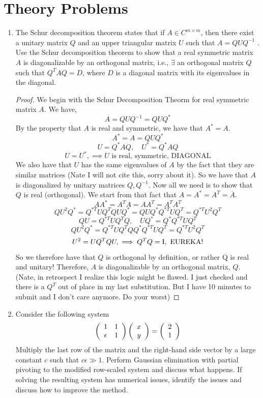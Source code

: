 \documentclass{article}
\begin{document}
\section{Theory Problems}
\begin{enumerate}

\item %
The Schur decomposition theorem states that if $A \in C^{m\times m}$, then there
exist a unitary matrix $Q$ and an upper triangular matrix $U$ such that
$A = QUQ^{-1}$ . Use the Schur decomposition theorem to show that a real
symmetric matrix $A$ is diagonalizable by an orthogonal matrix, i.e., $\exists$ an
orthogonal matrix $Q$ such that $Q^T AQ = D$, where $D$ is a diagonal matrix
with its eigenvalues in the diagonal.

\begin{proof}

We begin with the Schur Decomposition Theorm for real symmetric matrix $A$. We have, 
\[
    A = QUQ^{-1} = QUQ^*
\]
By the property that $A$ is real and symmetric, we have that $A^* = A$.
\[
    A^* = A = QUQ^*
\]
\[
    U = Q^*AQ, \quad U^* = Q^*AQ
\]
\[
    U = U^*, \implies U \text{ is real, symmetric, DIAGONAL}
\]
We also have that $U$ has the same eigenvalues of $A$ by the fact that they are similar matrices (Nate I will not cite this, sorry about it). So we have that $A$ is diagonalized by unitary matrices $Q, Q^{-1}$. Now all we need is to show that $Q$ is real (orthogonal). We start from that fact that $A = A^* = A^T = \overline{A}$.
\[
    AA^* = A^TA = AA^T = A^TA^T
\] 
\[
    QU^2Q^* = Q^{*T}UQ^TQUQ^* = QUQ^*Q^{*T}UQ^T = Q^{*T}U^2Q^T
\]
\[
   QU = Q^{*T}UQ^TQ, \quad UQ^* = Q^*Q^{*T}UQ^T
\]
\[
    QU^2Q^* = Q^{*T}UQ^TQQ^*Q^{*T}UQ^T = Q^{*T}U^2Q^T 
\]
\[
    U^2 = UQ^TQU, \implies Q^TQ = \mathrm{I}, \text{ EUREKA!}
\]
So we therefore have that $Q$ is orthogonal by definition, or rather Q is real and unitary! Therefore, $A$ is diagonalizable by an orthogonal matrix, $Q$. (Nate, in retrospect I realize this logic might be flawed. I just checked and there is a $Q^T$ out of place in my last substitution. But I have 10 minutes to submit and I don't care anymore. Do your worst)

\end{proof}

\item
Consider the following system
\[
\left(\begin{array}{c c}
1 & 1 \\
\epsilon & 1 
\end{array}\right) \left(\begin{array}{c}
x \\
y
\end{array}\right) = \left(\begin{array}{c}
2 \\ 
1
\end{array}\right) 
\]
Multiply the last row of the matrix and the right-hand side vector by a large
constant $c$ such that $c\epsilon \gg 1$. Perform Gaussian elimination with partial
pivoting to the modified row-scaled system and discuss what happens. If
solving the resulting system has numerical issues, identify the issues and
discuss how to improve the method.


\end{enumerate}
\end{document}
